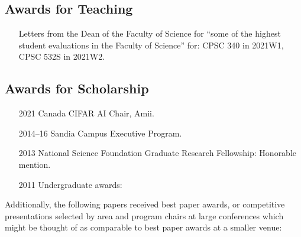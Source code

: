 \documentclass[10pt]{article}
\begin{document}

\subsection{Awards for Teaching} %

\begin{itemize}[leftmargin=5em]
    \item[] Letters from the Dean of the Faculty of Science for ``some of the highest student evaluations in the Faculty of Science'' for: CPSC 340 in 2021W1, CPSC 532S in 2021W2.
\end{itemize}

\subsection{Awards for Scholarship} %

\begin{itemize}[leftmargin=5em]
  \item[2021] {Canada CIFAR AI Chair, Amii. } %

  \item[2014--16] Sandia Campus Executive Program. 
  \item[2013] National Science Foundation Graduate Research Fellowship: Honorable mention.
  \item[2011] Undergraduate awards: 
\end{itemize}

Additionally, the following papers received best paper awards,
or competitive presentations selected by area and program chairs at large conferences
which might be thought of as comparable to best paper awards at a smaller venue:
\begin{itemize}[leftmargin=5em]
  
\end{itemize}
\end{document}
